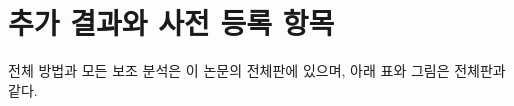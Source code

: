 \documentclass[10pt]{article}
\begin{document}



\clearpage
\appendix
\section{추가 결과와 사전 등록 항목}
\setcounter{table}{0}
\setcounter{figure}{0}
전체 방법과 모든 보조 분석은 이 논문의 전체판에 있으며, 아래 표와 그림은 전체판과 같다.
















\end{document}
